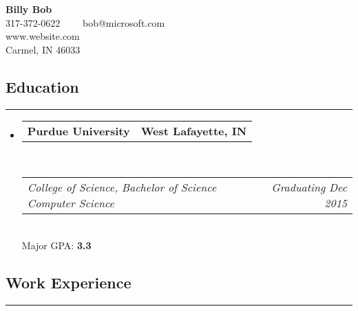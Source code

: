 \documentclass[11pt,letterpaper]{article}
\makeatletter
\newcommand{\headerrow}[2]
{\begin{tabular*}{\linewidth}{l@{\extracolsep{\fill}}r}
    #1 &
    #2 \\
\end{tabular*}}
\makeatother
\begin{document}
\setlength{\parindent}{0cm}

\begin{center}
{\LARGE \textbf{ Billy Bob }}
\\
317-372-0622\ \ \textbullet
\ \ bob@microsoft.com
\\ 
www.website.com
\\
Carmel, IN 46033
\\
\end{center}
\vspace{-2em}

\subsection*{Education}
\vspace{-0.4em}
\hrule

\begin{itemize}[label={},leftmargin=*]
\parskip=0.1em


\item
\headerrow 
{\textbf{ Purdue University }}
{\textbf{ West Lafayette, IN }}
\\
\headerrow
{\emph{ College of Science, Bachelor of Science Computer Science }}
{\emph{ Graduating Dec 2015 }}
\\
Major GPA: {\textbf{ 3.3 }}


\end{itemize}

\vspace{-1.5em}

\subsection*{Work Experience}
\vspace{-0.4em}
\hrule
\end{document}
